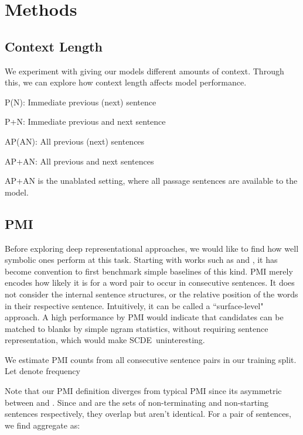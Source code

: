 \documentclass[11pt,a4paper]{article}
\newenvironment{tight_enumerate}{
\begin{enumerate}
  \setlength{\itemsep}{0pt}
  \setlength{\parskip}{0pt}
}{\end{enumerate}}
\newcommand{\dsname}{\textsc{SCDE}}
\begin{document}
\section{Methods}
\label{sec:methods}
\subsection{Context Length}
\label{sec:feature}
We experiment with giving our models different amounts of context. Through this, we can explore how context length affects model performance.
\vspace{-\topsep}
\begin{tight_enumerate}
  \setlength{\parskip}{0pt}
  \setlength{\itemsep}{0pt plus 1pt}
    \item \textsc{P(N)}: Immediate previous (next) sentence 
    \item \textsc{P+N}: Immediate previous and next sentence
    \item \textsc{AP(AN)}: All previous (next) sentences 
    \item \textsc{AP+AN}: All previous and next sentences
\end{tight_enumerate}
\vspace{-\topsep}
\textsc{AP+AN} is the unablated setting, where all passage sentences are available to the model.
\subsection{PMI} Before exploring deep representational approaches, we would like to find how well symbolic ones perform at this task. Starting with works such as  and , it has become convention to first benchmark simple baselines of this kind.  
PMI merely encodes how likely it is for a word pair to occur in consecutive sentences. It does not consider the internal sentence structures, or the relative position of the words in their respective sentence. Intuitively, it can be called a ``surface-level" approach. A high performance by PMI would indicate that candidates can be matched to blanks by simple ngram statistics, without requiring sentence representation, which would make \dsname~uninteresting.

We estimate PMI counts \cite{church1990word} from all consecutive sentence pairs in our training split. Let  denote frequency

Note that our PMI definition diverges from typical PMI since its asymmetric between  and . Since  and  are the sets of non-terminating and non-starting sentences respectively, they overlap but aren't identical. For a pair of sentences, we find aggregate  as:
\end{document}

